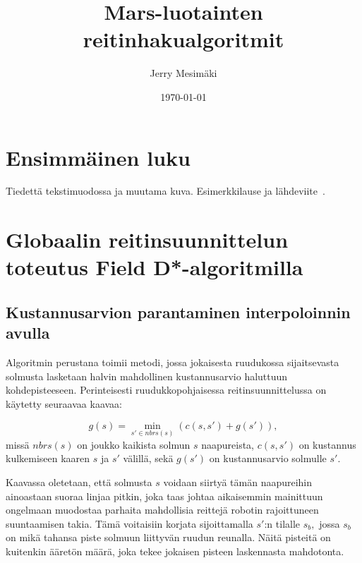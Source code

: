 \documentclass[finnish]{tktltiki2}
\title{Mars-luotainten reitinhakualgoritmit}
\author{Jerry Mesimäki}
\date{\today}
\theoremstyle{definition}
\theoremstyle{remark}
\begin{document}

\frontmatter      %

\maketitle        %
\makeabstract     %

\tableofcontents  %


\mainmatter       %

\section{Ensimmäinen luku}
Tiedettä tekstimuodossa ja muutama kuva.\newline
Esimerkkilause ja lähdeviite~\cite{esimerkki2}.

\section{Globaalin reitinsuunnittelun toteutus Field D*-algoritmilla}

\subsection{Kustannusarvion parantaminen interpoloinnin avulla}
Algoritmin perustana toimii metodi, jossa jokaisesta ruudukossa sijaitsevasta solmusta lasketaan halvin mahdollinen kustannusarvio haluttuun kohdepisteeseen. Perinteisesti ruudukkopohjaisessa reitinsuunnittelussa on käytetty seuraavaa kaavaa:

\[g(s) = \min_{s'\in nbrs(s)} (c(s, s') +g(s')),\]
missä \(nbrs(s)\) on joukko kaikista solmun \(s\) naapureista, \(c(s,s')\) on kustannus kulkemiseen kaaren \(s\) ja \(s'\) välillä, sekä \(g(s')\) on kustannusarvio solmulle \(s'\).
\newline


Kaavassa oletetaan, että solmusta \(s\) voidaan siirtyä tämän naapureihin ainoastaan suoraa linjaa pitkin, joka taas johtaa aikaisemmin mainittuun ongelmaan muodostaa parhaita mahdollisia reittejä robotin rajoittuneen suuntaamisen takia. Tämä voitaisiin korjata sijoittamalla \(s'\):n tilalle \(s_b,\) jossa \(s_b\) on mikä tahansa piste solmuun liittyvän ruudun reunalla. Näitä pisteitä on kuitenkin ääretön määrä, joka tekee jokaisen pisteen laskennasta mahdotonta.
\end{document}

